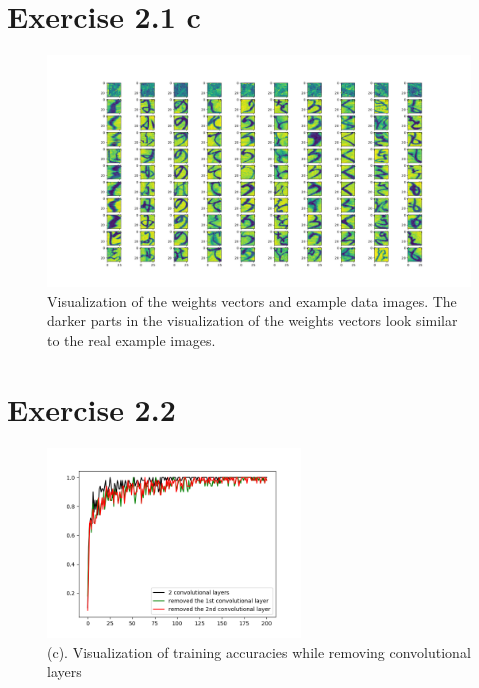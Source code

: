 \documentclass[11pt]{article} %
\begin{document}
\section*{Exercise 2.1 c}
\begin{figure}[htb]
  \centering
  \centerline{\includegraphics[width=1.35\textwidth ]{Figure_1_1.png}}
  \vspace{-5pt}
    \centering
\caption{Visualization of the weights vectors and example data images. The darker parts in the visualization of the weights vectors look similar to the real example images.}
\vspace{-1pt}
\end{figure}
\clearpage

\section*{Exercise 2.2}
\begin{figure}[htb]
  \centering
  \centerline{\includegraphics[width=0.6\textwidth ]{Figure_2_4.png}}
  \vspace{-5pt}
    \centering
\caption{(c). Visualization of training accuracies while removing convolutional layers}
\vspace{-1pt}
\end{figure}
\end{document}
